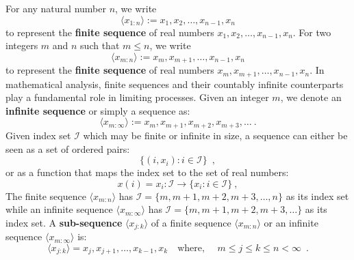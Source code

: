 For any natural number $n$, we write 
$$\boxed{\langle x_{1:n} \rangle := x_1,x_{2},\ldots,x_{n-1},x_n}$$ 
to represent the {\bf finite sequence} of real numbers $x_1,x_2,\ldots ,x_{n-1},x_n$.
For two integers $m$ and $n$ such that $m \leq n$, we write 
$$\boxed{\langle x_{m:n} \rangle := x_m,x_{m+1},\ldots,x_{n-1},x_n}$$ 
to represent the {\bf finite sequence} of real numbers $x_m,x_{m+1},\ldots ,x_{n-1},x_n$.  In mathematical analysis, finite sequences and their countably infinite counterparts play a fundamental role in limiting processes.  Given an integer $m$, we denote an {\bf infinite sequence} or simply a sequence as:
\[
\boxed{
\langle x_{m:\infty} \rangle := x_m, x_{m+1}, x_{m+2}, x_{m+3}, \ldots \ . }
\]
Given index set $\mathcal{I}$ which may be finite or infinite in size, a sequence can either be seen as a set of ordered pairs:
\[
\{ (i,x_i) : i \in \mathcal{I} \} \enspace ,
\]
or as a function that maps the index set to the set of real numbers:
\[
x(i)= x_i : \mathcal{I} \to \{x_{i} : i \in \mathcal{I} \} \ ,
\]
The finite sequence $\langle x_{m:n} \rangle$ has $\mathcal{I}= \{ m,m+1,m+2,m+3,\ldots,n \}$ as its index set  while an infinite sequence $\langle x_{m:\infty} \rangle$ has $\mathcal{I}= \{ m,m+1,m+2,m+3,\ldots \}$ as its index set.  A {\bf sub-sequence} $\langle x_{j:k} \rangle$ of a finite sequence $\langle x_{m:n} \rangle$ or an infinite sequence $\langle x_{m:\infty} \rangle$ is:
\[
\langle x_{j:k} \rangle = x_j,x_{j+1},\ldots,x_{k-1},x_{k} \quad \text{where, } \quad m \leq j \leq k \leq n < \infty \enspace .
\]

